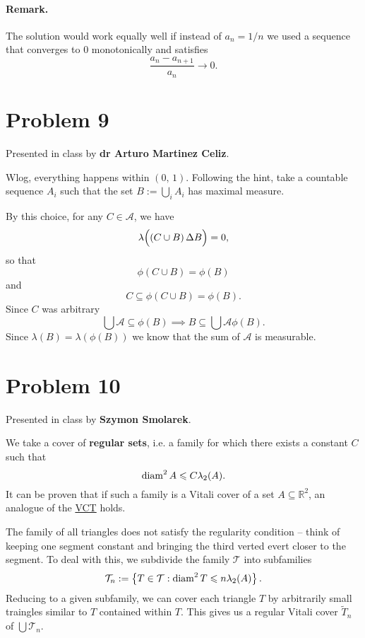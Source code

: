\paragraph{Remark.} The solution would work equally well if instead of \( a_n = 1/n \) we used a sequence that converges to \( 0 \) monotonically and satisfies
\[ 
    \frac{a_n - a_{n+1}}{a_n} \to 0.
\]

\section*{Problem 9}

Presented in class by \textbf{dr Arturo Martinez Celiz}.

Wlog, everything happens within \( (0,\,1) \). Following the hint, take a countable sequence \( A_i \) such that the set \( B := \bigcup_i A_i \) has maximal measure.

By this choice, for any \( C \in \mathcal{A} \), we have
\[ 
   \lambda \Bigl( \left( C \cup B \right) \Delta B \Bigr) = 0, 
\]
so that
\[ 
    \phi(C \cup B) = \phi(B)
\]
and
\[ 
    C \subseteq \phi(C \cup B) = \phi(B). 
\]
Since \( C \) was arbitrary
\[ 
    \bigcup \mathcal{A} \subseteq \phi(B) \implies B \subseteq \bigcup \mathcal{A} \phi(B).
\]
Since \( \lambda(B) =\lambda \left( \phi(B) \right) \) we know that the sum of \( \mathcal{A} \) is measurable.

\section*{Problem 10}

Presented in class by \textbf{Szymon Smolarek}. 

We take a cover of \textbf{regular sets}, i.e. a family for which there exists a constant \( C \) such that
\[ 
    \operatorname{diam}^2 A \leqslant C \lambda_2(A).
\]
It can be proven that if such a family is a Vitali cover of a set \( A \subseteq \mathbb{R}^2 \), an analogue of the \hyperlink{VitaliCoveringTheorem}{VCT} holds.

The family of all triangles does not satisfy the regularity condition -- think of keeping one segment constant and bringing the third verted evert closer to the segment. To deal with this, we subdivide the family \( \mathcal{T} \) into subfamilies
\[ 
    \mathcal{T}_n := \left\{ T \in \mathcal{T} : \operatorname{diam}^2 T \leqslant n\lambda_2(A) \right\}.
\]
Reducing to a given subfamily, we can cover each triangle \( T \) by arbitrarily small traingles similar to \( T \) contained within \( T \). This gives us a regular Vitali cover \( \widetilde{T}_n \) of \( \bigcup \mathcal{T}_n \).

